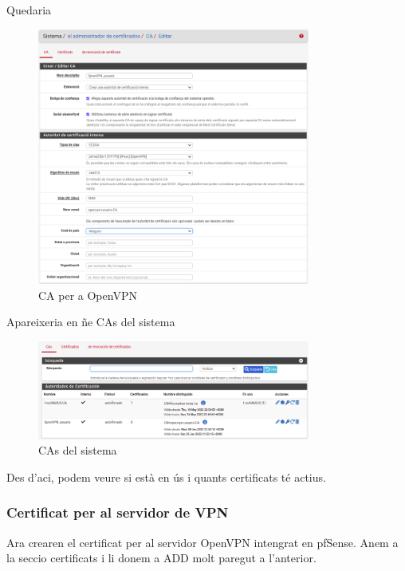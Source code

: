 \documentclass[
  10pt,
]{krantz}
\begin{document}
Quedaria

\begin{figure}
\centering
\includegraphics[width=0.8\textwidth,height=\textheight]{imatges/proxmox/CA_openVPN.png}
\caption{CA per a OpenVPN}
\end{figure}

Apareixeria en ñe CAs del sistema

\begin{figure}
\centering
\includegraphics[width=0.8\textwidth,height=\textheight]{imatges/proxmox/CAs_pfsense.png}
\caption{CAs del sistema}
\end{figure}

Des d'aci, podem veure si està en ús i quants certificats té actius.

\hypertarget{certificat-per-al-servidor-de-vpn}{%
\subsubsection{Certificat per al servidor de VPN}\label{certificat-per-al-servidor-de-vpn}}

Ara crearen el certificat per al servidor OpenVPN intengrat en pfSense. Anem a la seccio certificats i li donem a ADD molt paregut a l'anterior.
\end{document}
